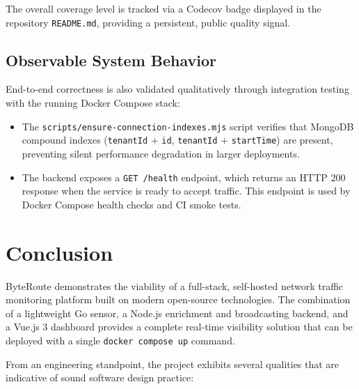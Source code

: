 \documentclass[12pt]{report}
\begin{document}
The overall coverage level is tracked via a Codecov badge displayed in the
repository \texttt{README.md}, providing a persistent, public quality signal.

\section{Observable System Behavior}

End-to-end correctness is also validated qualitatively through integration
testing with the running Docker Compose stack:

\begin{itemize}
  \item The \texttt{scripts/ensure-connection-indexes.mjs} script verifies that
    MongoDB compound indexes (\texttt{tenantId} + \texttt{id},
    \texttt{tenantId} + \texttt{startTime}) are present, preventing silent
    performance degradation in larger deployments.
  \item The backend exposes a \texttt{GET /health} endpoint, which returns an
    HTTP 200 response when the service is ready to accept traffic. This endpoint
    is used by Docker Compose health checks and CI smoke tests.
\end{itemize}

\chapter{Conclusion}
\label{chap:conclusion}

ByteRoute demonstrates the viability of a full-stack, self-hosted network
traffic monitoring platform built on modern open-source technologies. The
combination of a lightweight Go sensor, a Node.js enrichment and broadcasting
backend, and a Vue.js 3 dashboard provides a complete real-time visibility
solution that can be deployed with a single \texttt{docker compose up} command.

From an engineering standpoint, the project exhibits several qualities that are
indicative of sound software design practice:
\end{document}
